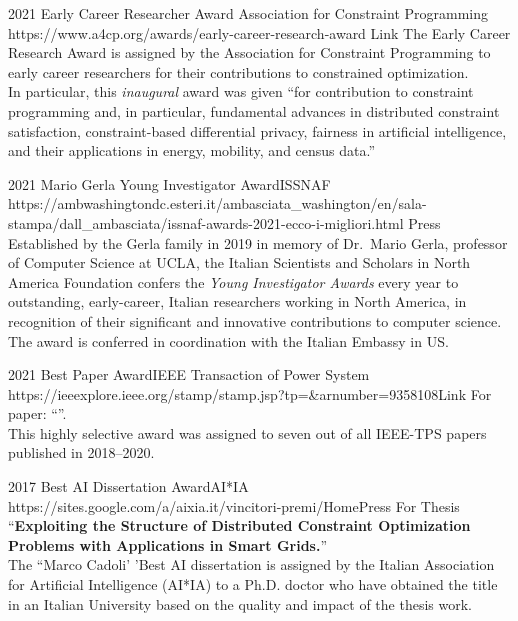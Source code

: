 \begin{awards}
	\awardentryD
	{2021}
	{Early Career Researcher Award}
	{Association for Constraint Programming}
	{https://www.a4cp.org/awards/early-career-research-award}
	{Link}
	{The Early Career Research Award is assigned by the Association for Constraint Programming to early career researchers for their 
	contributions to constrained optimization.\\
	In particular, this \emph{inaugural} award was given 
	``for contribution to constraint programming and, in particular,
	fundamental advances in distributed constraint satisfaction, constraint-based
	differential privacy, fairness in artificial intelligence, and their 
	applications in energy, mobility, and census data.''}

	\awardentryD
	{2021}
	{Mario Gerla Young Investigator Award}{ISSNAF}
	{https://ambwashingtondc.esteri.it/ambasciata_washington/en/sala-stampa/dall_ambasciata/issnaf-awards-2021-ecco-i-migliori.html}
	{Press}
	{
	Established by the Gerla family in 2019 in memory of Dr.~Mario Gerla, professor of Computer Science at UCLA, the Italian Scientists and Scholars in North America Foundation confers the \emph{Young Investigator Awards} every year to outstanding, early-career, Italian researchers working in North America, in recognition of their significant and innovative contributions to computer science.
	The award is conferred in coordination with the Italian Embassy in US.
	}

	\awardentryD
	{2021}
	{Best Paper Award}{IEEE Transaction of Power System}
	{https://ieeexplore.ieee.org/stamp/stamp.jsp?tp=\&arnumber=9358108}{Link}
	{
	For paper: ``''.\\
	This highly selective award was assigned to seven out of all IEEE-TPS papers published in 2018--2020.}

	\awardentryD
	{2017}
	{Best AI Dissertation Award}{AI*IA} %
	{https://sites.google.com/a/aixia.it/vincitori-premi/Home}{Press}
	{For Thesis ``\textbf{Exploiting the Structure of Distributed Constraint Optimization Problems with Applications in Smart Grids.}''\\
	The ``Marco Cadoli' 'Best AI dissertation is assigned by the Italian 
	Association for Artificial Intelligence (AI*IA) to a Ph.D. doctor 
	who have obtained the title in an Italian University based on the 
	quality and impact of the thesis work.
	}


\end{awards}
